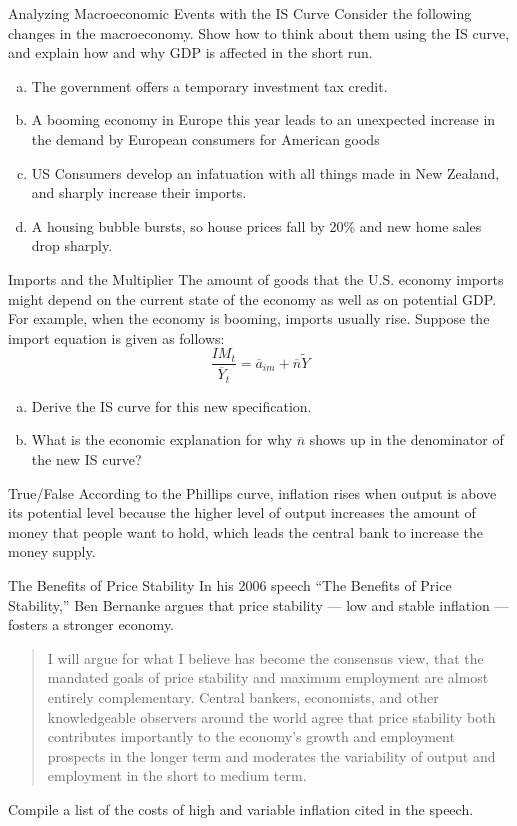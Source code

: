\documentclass[8pt]{extarticle}
\begin{document}
  \begin{problem}{Analyzing Macroeconomic Events with the IS Curve}
    Consider the following changes in the macroeconomy. Show how to think about them using the IS curve, and explain how and why GDP is affected in the short run.
    \begin{enumerate}[(a)]
      \item The government offers a temporary investment tax credit.
      \item A booming economy in Europe this year leads to an unexpected increase in the demand by European consumers for American goods
      \item US Consumers develop an infatuation with all things made in New Zealand, and sharply increase their imports.
      \item A housing bubble bursts, so house prices fall by 20\% and new home sales drop sharply.
    \end{enumerate}
  \end{problem}
  \begin{problem}{Imports and the Multiplier}
    The amount of goods that the U.S. economy imports might depend on the current state of the economy as well as on potential GDP. For example, when the economy is booming, imports usually rise. Suppose the import equation is given as follows:
    \[
      \frac{IM_t}{\overline{Y}_t} = \overline{a}_{im} + \overline{n}\tilde{Y}
    \]
    \begin{enumerate}[(a)]
      \item Derive the IS curve for this new specification.
      \item What is the economic explanation for why $\overline{n}$ shows up in the denominator of the new IS curve?
    \end{enumerate}
  \end{problem}
  \begin{problem}{True/False}
    According to the Phillips curve, inflation rises when output is above its potential level because the higher level of output increases the amount of money that people want to hold, which leads the central bank to increase the money supply.
  \end{problem}
  \begin{problem}{The Benefits of Price Stability}
    In his 2006 speech ``The Benefits of Price Stability,'' Ben Bernanke argues that price stability --- low and stable inflation --- fosters a stronger economy.
    \begin{quote}
        I will argue for what I believe has become the consensus view, that the mandated goals of price stability and maximum employment are almost entirely complementary. Central bankers, economists, and other knowledgeable observers around the world agree that price stability both contributes importantly to the economy's growth and employment prospects in the longer term and moderates the variability of output and employment in the short to medium term.
    \end{quote}
    Compile a list of the costs of high and variable inflation cited in the speech.
  \end{problem}
\end{document}
